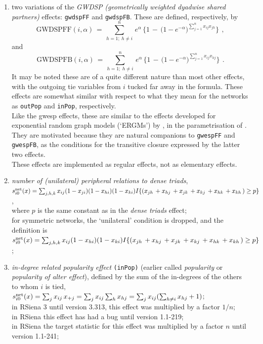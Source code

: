 \documentclass[a4paper,fleqn,11pt]{article}
\newcommand{\+}{\, + \,}
\newcommand{\RS}{{\sf \textsf{RSiena} }}
\newcommand{\vit}{\theenumi}
\begin{document}
\begin{enumerate}
\item two variations of the
   \emph{GWDSP (geometrically weighted dyadwise shared partners)} effects:
   \texttt{gwdspFF} and \texttt{gwdspFB}.
   These are defined, respectively, by
\begin{equation}
  \text{GWDSPFF}(i, \alpha) \,=\,
       \sum_{h=1;\; h \neq i}^n \, e^{\alpha} \,\Big\{1 \,-\, \big(1 -
   e^{-\alpha}\big)^{\sum_{j=1}^n x_{ij}x_{jh} }  \Big\}    \,   \ ,
\end{equation}
and
\begin{equation}
  \text{GWDSPFB}(i, \alpha) \,=\,
       \sum_{h=1;\; h \neq i}^n \, e^{\alpha} \,\Big\{1 \,-\, \big(1 -
   e^{-\alpha}\big)^{\sum_{j=1}^n x_{ij}x_{hj} }  \Big\}    \,   \ .
\end{equation}
   It may be noted these are of a quite different nature than most other effects,
   with the outgoing tie variables from $i$ tucked far away in the formula.
   These effects are somewhat similar with respect to what they mean for the
   networks as \texttt{outPop} and \texttt{inPop}, respectively.\\
   Like the gwesp effects, these are similar to the effects developed for
   exponential random graph models (`ERGMs')
   by \citet{SPRH06}, in the parametrisation of \citet{Hunter2007}.
   They are motivated because they are natural companions to \texttt{gwespFF}
   and \texttt{gwespFB}, as the conditions for the transitive closure
   expressed by the latter two effects.\\
   These effects are implemented as regular effects, not as elementary effects.

 \item {\em number of (unilateral) peripheral relations to dense triads},\\
 $s^{\rm net}_{i\vit}(x) =  \sum_{j,h,k} x_{ij} (1-x_{ji})(1-x_{hi})(1-x_{ki})
 I\{ (x_{jh}\,  + x_{hj}\, + x_{jk}\, + x_{kj}\, + x_{hk}\, + x_{kh}\,)\geq p \} \,$,\\
 where $p$ is the same constant as in the {\it dense triads} effect;\\
 for symmetric networks, the `unilateral' condition is dropped, and the definition is\\
 $s^{\rm net}_{i\vit}(x) =  \sum_{j,h,k} x_{ij} (1-x_{hi})(1-x_{ki})
 I\{ (x_{jh}\,  + x_{hj}\, + x_{jk}\, + x_{kj}\, + x_{hk}\, + x_{kh}\,)\geq p \} \,$;



 \item {\em in-degree related popularity effect} \texttt{(inPop)}
 (earlier called {\em popularity} or {\em popularity of alter effect}), defined by
  the sum of
 the in-degrees of the others to whom $i$ is tied,\\
 $s^{\rm net}_{i\vit}(x) =  \sum_j x_{ij}\, x_{+j} =
 \sum_j x_{ij} \sum_h x_{hj} = \sum_j x_{ij} (\sum_{h \neq i} x_{hj} + 1)$;\\
 in \RS 3 until version 3.313, this effect was multiplied by a factor $1/n$;\\
 in \RS this effect has had a bug until version 1.1-219;\\
 in \RS the target statistic for this effect was multiplied by a factor $n$ until version 1.1-241;


\end{enumerate}
\end{document}
